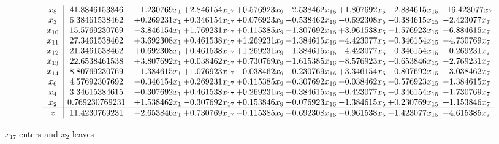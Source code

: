 \documentclass[10pt]{article}
\begin{document}
 \[\begin{array}{c| c c@{\hskip 2pt} c@{\hskip 2pt} c@{\hskip 2pt} c@{\hskip 2pt} c@{\hskip 2pt} c@{\hskip 2pt} c@{\hskip 2pt} }
 x_{8}   &  41.8846153846 & -1.230769 x_{1} & + 2.846154 x_{17} & + 0.576923 x_{9} & -2.538462 x_{16} & + 1.807692 x_{5} & -2.884615 x_{15} & -16.423077 x_{7}\\
 x_{3}   &  6.38461538462 & + 0.269231 x_{1} & + 0.346154 x_{17} & + 0.076923 x_{9} & -0.538462 x_{16} & -0.692308 x_{5} & -0.384615 x_{15} & -2.423077 x_{7}\\
 x_{10}   &  15.5769230769 & -3.846154 x_{1} & + 1.769231 x_{17} & + 0.115385 x_{9} & -1.307692 x_{16} & + 3.961538 x_{5} & -1.576923 x_{15} & -6.884615 x_{7}\\
 x_{11}   &  27.3461538462 & + 3.692308 x_{1} & + 0.461538 x_{17} & + 1.269231 x_{9} & -1.384615 x_{16} & -4.423077 x_{5} & -0.346154 x_{15} & -4.730769 x_{7}\\
 x_{12}   &  21.3461538462 & + 0.692308 x_{1} & + 0.461538 x_{17} & + 1.269231 x_{9} & -1.384615 x_{16} & -4.423077 x_{5} & -0.346154 x_{15} & + 0.269231 x_{7}\\
 x_{13}   &  22.6538461538 & + 3.807692 x_{1} & + 0.038462 x_{17} & + 0.730769 x_{9} & -1.615385 x_{16} & -8.576923 x_{5} & -0.653846 x_{15} & -2.769231 x_{7}\\
 x_{14}   &  8.80769230769 & -1.384615 x_{1} & + 1.076923 x_{17} & -0.038462 x_{9} & -0.230769 x_{16} & + 3.346154 x_{5} & -0.807692 x_{15} & -3.038462 x_{7}\\
 x_{6}   &  4.57692307692 & -0.346154 x_{1} & + 0.269231 x_{17} & + 0.115385 x_{9} & -0.307692 x_{16} & -0.038462 x_{5} & -0.576923 x_{15} & -1.384615 x_{7}\\
 x_{4}   &  3.34615384615 & -0.307692 x_{1} & + 0.461538 x_{17} & + 0.269231 x_{9} & -0.384615 x_{16} & -0.423077 x_{5} & -0.346154 x_{15} & -1.730769 x_{7}\\
 x_{2}   &  0.769230769231 & + 1.538462 x_{1} & -0.307692 x_{17} & + 0.153846 x_{9} & -0.076923 x_{16} & -1.384615 x_{5} & + 0.230769 x_{15} & + 1.153846 x_{7}\\
\hline
z    &  11.4230769231 & -2.653846 x_{1} & + 0.730769 x_{17} & -0.115385 x_{9} & -0.692308 x_{16} & -0.961538 x_{5} & -1.423077 x_{15} & -4.615385 x_{7}\\
\end{array}\]


 $ x_{17} $ enters and $ x_{2} $ leaves 
\end{document}
